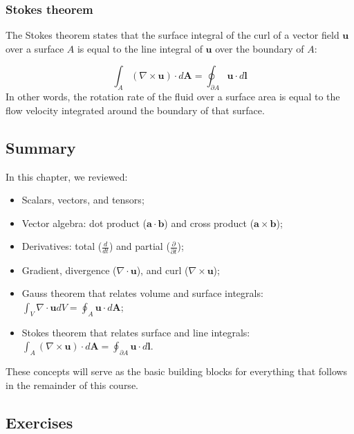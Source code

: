 \documentclass[12pt]{article}
\numberwithin{equation}{section}
\numberwithin{figure}{section}
\numberwithin{table}{section}
\begin{document}
\subsubsection{Stokes theorem}

The Stokes theorem states that the surface integral of the curl of a
vector field $\mathbf{u}$ over a surface $A$ is equal to the line integral of
$\mathbf{u}$ over the boundary of $A$:

\begin{equation}
  \int_A (\nabla \times \mathbf{u}) \cdot d\mathbf{A} = \oint_{\partial A} \mathbf{u} \cdot d\mathbf{l}
\end{equation}
In other words, the rotation rate of the fluid over a surface area is equal to
the flow velocity integrated around the boundary of that surface.

\subsection*{Summary}

In this chapter, we reviewed:

\begin{itemize}
  \item Scalars, vectors, and tensors;
  \item Vector algebra: dot product ($\mathbf{a} \cdot \mathbf{b}$) and cross
  product ($\mathbf{a} \times \mathbf{b}$);
  \item Derivatives: total ($\frac{d}{dt}$) and partial ($\frac{\partial}{\partial t}$);
  \item Gradient, divergence ($\nabla \cdot \mathbf{u}$), and curl ($\nabla \times \mathbf{u}$);
  \item Gauss theorem that relates volume and surface integrals:
  $\int_V \nabla \cdot \mathbf{u} dV = \oint_A \mathbf{u} \cdot d\mathbf{A}$;
  \item Stokes theorem that relates surface and line integrals:
  $\int_A (\nabla \times \mathbf{u}) \cdot d\mathbf{A} = \oint_{\partial A} \mathbf{u} \cdot d\mathbf{l}$.
\end{itemize}

These concepts will serve as the basic building blocks for everything that
follows in the remainder of this course.

\subsection*{Exercises}
\end{document}
